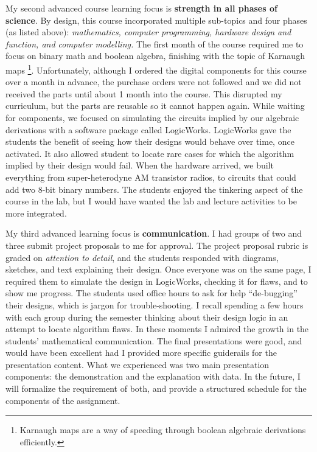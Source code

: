 \documentclass[../../../main.tex]{subfiles}
\begin{document}
My second advanced course learning focus is \textbf{strength in all phases of science}.  By design, this course incorporated multiple sub-topics and four phases (as listed above): \textit{mathematics, computer programming, hardware design and function, and computer modelling.}  The first month of the course required me to focus on binary math and boolean algebra, finishing with the topic of Karnaugh maps \footnote{Karnaugh maps are a way of speeding through boolean algebraic derivations efficiently.}.  Unfortunately, although I ordered the digital components for this course over a month in advance, the purchase orders were not followed and we did not received the parts until about 1 month into the course.  This disrupted my curriculum, but the parts are reusable so it cannot happen again.  While waiting for components, we focused on simulating the circuits implied by our algebraic derivations with a software package called LogicWorks.  LogicWorks gave the students the benefit of seeing how their designs would behave over time, once activated.  It also allowed student to locate rare cases for which the algorithm implied by their design would fail.  When the hardware arrived, we built everything from super-heterodyne AM transistor radios, to circuits that could add two 8-bit binary numbers.  The students enjoyed the tinkering aspect of the course in the lab, but I would have wanted the lab and lecture activities to be more integrated. \\ \hspace{0.1cm}

My third advanced learning focus is \textbf{communication}.  I had groups of two and three submit project proposals to me for approval.  The project proposal rubric is graded on \textit{attention to detail}, and the students responded with diagrams, sketches, and text explaining their design.  Once everyone was on the same page, I required them to simulate the design in LogicWorks, checking it for flaws, and to show me progress.  The students used office hours to ask for help ``de-bugging'' their designs, which is jargon for trouble-shooting.  I recall spending a few hours with each group during the semester thinking about their design logic in an attempt to locate algorithm flaws.  In these moments I admired the growth in the students' mathematical communication.  The final presentations were good, and would have been excellent had I provided more specific guiderails for the presentation content.  What we experienced was two main presentation components: the demonstration and the explanation with data.  In the future, I will formalize the requirement of both, and provide a structured schedule for the components of the assignment. \\ \hspace{0.1cm}
\end{document}
